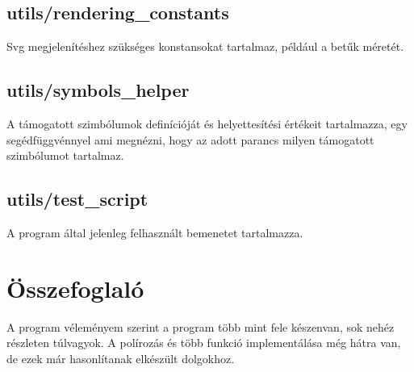 \documentclass{article}[12pt,a4paper]
\begin{document}
    \subsection{utils/rendering\_constants}
    Svg megjelenítéshez szükséges konstansokat tartalmaz, például a betűk méretét.

    \subsection{utils/symbols\_helper}
    A támogatott szimbólumok definícióját és helyettesítési értékeit tartalmazza, egy segédfüggvénnyel ami megnézni, hogy az adott parancs milyen támogatott szimbólumot tartalmaz.

    \subsection{utils/test\_script}
    A program által jelenleg felhasznált bemenetet tartalmazza.

    \section{Összefoglaló}
    A program véleményem szerint a program több mint fele készenvan, sok nehéz részleten túlvagyok.
    A polírozás és több funkció implementálása még hátra van, de ezek már hasonlítanak elkészült dolgokhoz.
\end{document}
